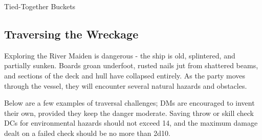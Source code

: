 \begin{DndTrap}[width=0.5\textwidth - 4pt]{Tied-Together Buckets}
\end{DndTrap}

\subsection*{Traversing the Wreckage}
{\entryfont\noindent Exploring the River Maiden is dangerous - the ship is old, splintered, and partially sunken. Boards groan underfoot, rusted nails jut from shattered beams, and sections of the deck and hull have collapsed entirely. As the party moves through the vessel, they will encounter several natural hazards and obstacles.

\noindent Below are a few examples of traversal challenges; DMs are encouraged to invent their own, provided they keep the danger moderate. Saving throw or skill check DCs for environmental hazards should not exceed 14, and the maximum damage dealt on a failed check should be no more than 2d10.}

